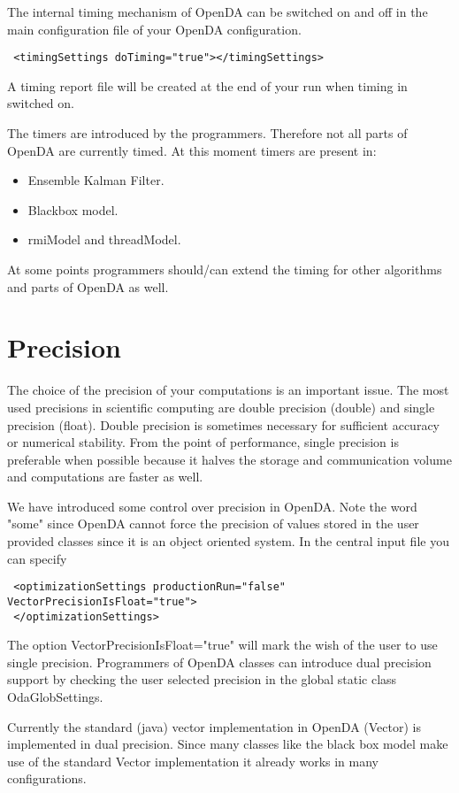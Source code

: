 The internal timing mechanism of OpenDA can be switched on and off in the main configuration file of your OpenDA configuration. 
{\footnotesize
\begin{verbatim}
 <timingSettings doTiming="true"></timingSettings>
\end{verbatim}}  
A timing report file will be created at the end of your run when timing in switched on.

The timers are introduced by the programmers. Therefore not all parts of OpenDA are currently timed. At this moment timers are present in:
\begin{itemize}
\item Ensemble Kalman Filter.
\item Blackbox model.
\item rmiModel and threadModel.
\end{itemize}

At some points programmers should/can extend the timing for other algorithms and parts of OpenDA as well.

\section{Precision}
The choice of the precision of your computations is an important issue. The most used precisions in scientific computing are double precision (double) and single precision (float). Double precision is sometimes necessary for sufficient accuracy or numerical stability. From the point of performance, single precision is preferable when possible because it halves the storage and communication volume and computations are faster as well.

We have introduced some control over precision in OpenDA. Note the word "some" since OpenDA cannot force the precision of values stored in the user provided classes since it is an object oriented system. In the central input file you can specify
{\footnotesize
\begin{verbatim}
 <optimizationSettings productionRun="false" VectorPrecisionIsFloat="true">
 </optimizationSettings>
\end{verbatim}}  
The option VectorPrecisionIsFloat="true" will mark the wish of the user to use single precision. Programmers of OpenDA classes can introduce dual precision support by checking the user selected precision in the global static class OdaGlobSettings.

Currently the standard (java) vector implementation in OpenDA (Vector) is implemented in dual precision. Since many classes like the black box model make use of the standard Vector implementation it already works in many configurations. 

